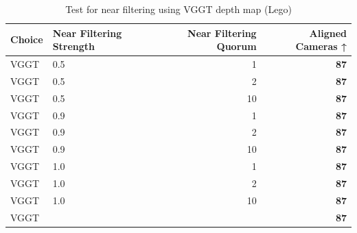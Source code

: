 \begin{table}[H]
\caption{Test for near filtering using VGGT depth map (Lego)}
\label{tab:99_near_filtering_gt_cams_lego}
\begin{tabular}{llrr}
\toprule
Choice & Near Filtering Strength & Near Filtering Quorum & Aligned Cameras ↑ \\
\midrule
VGGT & 0.5 & 1 & \textbf{87} \\
VGGT & 0.5 & 2 & \textbf{87} \\
VGGT & 0.5 & 10 & \textbf{87} \\
VGGT & 0.9 & 1 & \textbf{87} \\
VGGT & 0.9 & 2 & \textbf{87} \\
VGGT & 0.9 & 10 & \textbf{87} \\
VGGT & 1.0 & 1 & \textbf{87} \\
VGGT & 1.0 & 2 & \textbf{87} \\
VGGT & 1.0 & 10 & \textbf{87} \\
VGGT &  &  & \textbf{87} \\
\bottomrule
\end{tabular}
\end{table}
